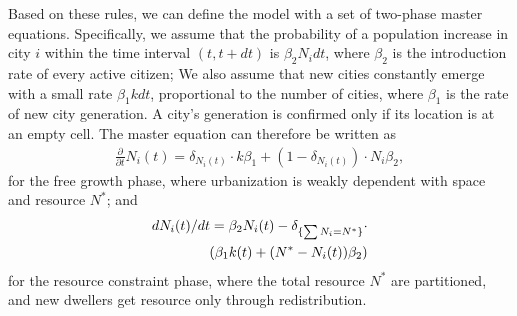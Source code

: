 \documentclass[reprint,unsortedaddress,amsmath,amssymb,aps,prl,showkeys]{revtex4-2}
\begin{document}
Based on these rules, we can define the model with a set of two-phase master equations. Specifically, we assume that the probability of a population increase in city $i$ within the time interval $(t,t+dt)$ is $\beta_2N_idt$, where $\beta_2$ is the introduction rate of every active citizen; We also assume that new cities constantly emerge with a small rate $\beta_1kdt$, proportional to the number of cities, where $\beta_1$ is the rate of new city generation. A city's generation is confirmed only if its location is at an empty cell. The master equation can therefore be written as \begin{align}\frac{\partial}{\partial t}N_i(t) =  \delta_{N_i(t)}\cdot k\beta_1+ (1-\delta_{N_i(t)})\cdot N_i\beta_2, \end{align} for the free growth phase, where urbanization is weakly dependent with space and resource $N^*$;
and \begin{align}
dN_i(t)/dt = \beta_2 N_i(t) -\delta_{\{\sum N_i = N^*\}}\cdot\notag \\ \left(\beta_1k(t) + (N^*-N_i(t))\beta_2 \right)
\end{align}
for the resource constraint phase, where the total resource $N^*$ are partitioned, and new dwellers get resource only through redistribution. 
\end{document}
